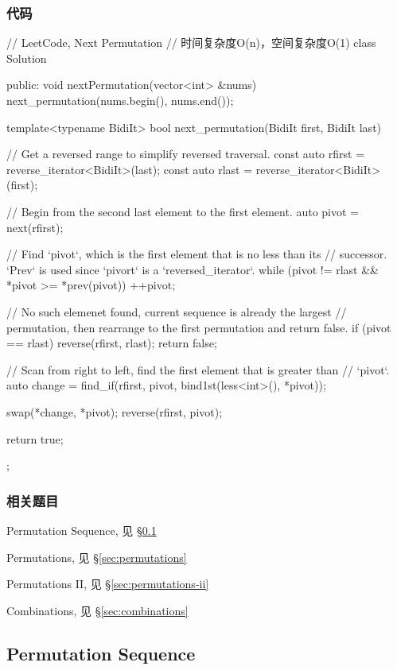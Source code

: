 \subsubsection{代码}
\begin{Code}
// LeetCode, Next Permutation
// 时间复杂度O(n)，空间复杂度O(1)
class Solution {
public:
    void nextPermutation(vector<int> &nums) {
        next_permutation(nums.begin(), nums.end());
    }

    template<typename BidiIt>
    bool next_permutation(BidiIt first, BidiIt last) {
        // Get a reversed range to simplify reversed traversal.
        const auto rfirst = reverse_iterator<BidiIt>(last);
        const auto rlast = reverse_iterator<BidiIt>(first);

        // Begin from the second last element to the first element.
        auto pivot = next(rfirst);

        // Find `pivot`, which is the first element that is no less than its
        // successor.  `Prev` is used since `pivort` is a `reversed_iterator`.
        while (pivot != rlast && *pivot >= *prev(pivot))
            ++pivot;

        // No such elemenet found, current sequence is already the largest
        // permutation, then rearrange to the first permutation and return false.
        if (pivot == rlast) {
            reverse(rfirst, rlast);
            return false;
        }

        // Scan from right to left, find the first element that is greater than
        // `pivot`.
        auto change = find_if(rfirst, pivot, bind1st(less<int>(), *pivot));

        swap(*change, *pivot);
        reverse(rfirst, pivot);

        return true;
    }
};
\end{Code}


\subsubsection{相关题目}
\begindot
\item Permutation Sequence, 见 \S \ref{sec:permutation-sequence}
\item Permutations, 见 \S \ref{sec:permutations}
\item Permutations II, 见 \S \ref{sec:permutations-ii}
\item Combinations, 见 \S \ref{sec:combinations}
\myenddot


\subsection{Permutation Sequence} %
\label{sec:permutation-sequence}


